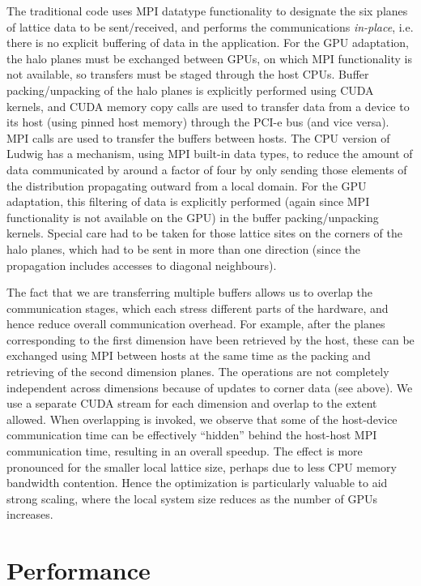 The
traditional code uses MPI datatype functionality to designate the six
planes of lattice data to be sent/received, and performs the
communications {\it in-place}, i.e.  there is no explicit buffering of
data in the application.  For the GPU adaptation, the halo planes must
be exchanged between GPUs, on which MPI functionality is not
available, so transfers must be staged through the host CPUs. Buffer
packing/unpacking of the halo planes is explicitly performed using
CUDA kernels, and CUDA memory copy calls are used to transfer data
from a device to its host (using pinned host memory) through the PCI-e
bus (and vice versa). MPI calls are used to transfer the buffers
between hosts. The CPU version of Ludwig has a mechanism, using MPI built-in
data types, to reduce the amount of data communicated by around a
factor of four by only sending those elements of the distribution
propagating outward from a local domain. For the GPU adaptation, this
filtering of data is explicitly performed (again since MPI
functionality is not available on the GPU) in the buffer
packing/unpacking kernels.  Special care had to be taken for those
lattice sites on the corners of the halo planes, which had to be sent
in more than one direction (since the propagation includes accesses to
diagonal neighbours).

The fact that we are transferring multiple buffers allows us to
overlap the communication stages, which each stress different parts of
the hardware, and hence reduce overall communication overhead.  For
example, after the planes corresponding to the first dimension have
been retrieved by the host, these can be exchanged using MPI between
hosts at the same time as the packing and retrieving of the second
dimension planes. The operations are not completely independent across
dimensions because of updates to corner data (see above). We use a
separate CUDA stream for each dimension and overlap to the extent
allowed. When overlapping is invoked, we observe that some of the
host-device communication time can be effectively ``hidden'' behind
the host-host MPI communication time, resulting in an overall speedup.
The effect is more pronounced for the smaller local lattice size,
perhaps due to less CPU memory bandwidth contention. Hence the
optimization is particularly valuable to aid strong scaling, where the
local system size reduces as the number of GPUs increases.


\section{Performance}\label{ch14:sec:performance}

